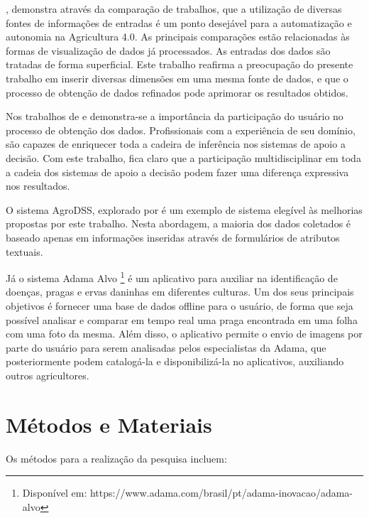 \documentclass[12pt]{article}
\begin{document}
\cite{Gutierrez:2019}, demonstra através da comparação de trabalhos, que a utilização de diversas fontes de informações de entradas é um ponto desejável para a automatização e autonomia na Agricultura 4.0. As principais comparações estão relacionadas às formas de visualização de dados já processados. As entradas dos dados são tratadas de forma superficial. Este trabalho reafirma a preocupação do presente trabalho em inserir diversas dimensões em uma mesma fonte de dados, e que o processo de obtenção de dados refinados pode aprimorar os resultados obtidos.

Nos trabalhos de \cite{Walling:2020} e \cite{Lundstrom:2018} demonstra-se a importância da participação do usuário no processo de obtenção dos dados. Profissionais com a experiência de seu domínio, são capazes de enriquecer toda a cadeira de inferência nos sistemas de apoio a decisão. Com este trabalho, fica claro que a participação multidisciplinar em toda a cadeia dos sistemas de apoio a decisão podem fazer uma diferença expressiva nos resultados.

O sistema AgroDSS, explorado por \cite{Rupnik:2019} é um exemplo de sistema elegível às melhorias propostas por este trabalho. Nesta abordagem, a maioria dos dados coletados é baseado apenas em informações inseridas através de formulários de atributos textuais.

Já o sistema Adama Alvo \footnote{Disponível em: https://www.adama.com/brasil/pt/adama-inovacao/adama-alvo} é um aplicativo para auxiliar na identificação de doenças, pragas e ervas daninhas em diferentes culturas. Um dos seus principais objetivos é fornecer uma base de dados offline para o usuário, de forma que seja possível analisar e comparar em tempo real uma praga encontrada em uma folha com uma foto da mesma. Além disso,  o aplicativo permite o envio de imagens por parte do usuário para serem analisadas pelos especialistas da Adama, que posteriormente podem catalogá-la e disponibilizá-la no aplicativos, auxiliando outros agricultores.

\section{Métodos e Materiais}
		
Os métodos para a realização da pesquisa incluem:
\end{document}
